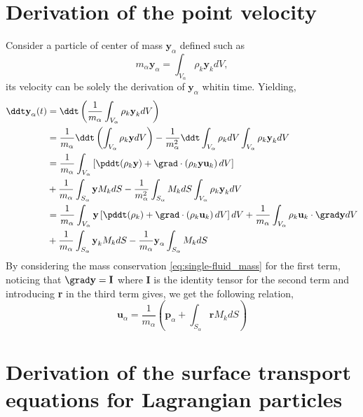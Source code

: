 \section{Derivation of the point velocity}
Consider a particle of center of mass $\textbf{y}_\alpha$ defined such as
\begin{equation*}
    m_\alpha \textbf{y}_\alpha
    = \int_{V_\alpha} \rho_k \textbf{y}_k dV,
\end{equation*}
its velocity can be solely the derivation of $\textbf{y}_\alpha$ whitin time.
Yielding, 
\begin{align*}
    \ddt \textbf{y}_\alpha (t)
    &=
    \ddt \left(
        \frac{1}{m_\alpha} \int_{V_\alpha} \rho_k \textbf{y}_k dV
    \right)\\
    &= \frac{1}{m_\alpha}
    \ddt 
    \left(
        \int_{V_\alpha} \rho_k \textbf{y} dV
    \right)
    - \frac{1}{m_\alpha^2} \ddt \int_{V_\alpha} \rho_k dV \int_{V_\alpha} \rho_k \textbf{y}_k dV
    \\
    &= \frac{1}{m_\alpha}\int_{V_\alpha} \left[
        \pddt (\rho_k \textbf{y}) + \grad \cdot\left(\rho_k \textbf{y}\textbf{u}_k\right) dV 
    \right]\\
    &+ \frac{1}{m_\alpha}\int_{S_\alpha} \textbf{y} M_k d S
    -  \frac{1}{m_\alpha^2} \int_{S_\alpha} M_k dS  \int_{V_\alpha} \rho_k \textbf{y}_k dV
    \\
    &= \frac{1}{m_\alpha}\int_{V_\alpha} \textbf{y} \left[
    \pddt (\rho_k) + \grad \cdot\left(\rho_k \textbf{u}_k\right) dV 
    \right]dV
    + \frac{1}{m_\alpha}\int_{V_\alpha} \rho_k  \textbf{u}_k  \cdot \grad \textbf{y} dV \\
    &+ \frac{1}{m_\alpha}\int_{S_\alpha} \textbf{y}_k M_k d S
    - \frac{1}{m_\alpha}  \textbf{y}_\alpha \int_{S_\alpha} M_k dS
\end{align*}
By considering the mass conservation \ref{eq:single-fluid_mass} for the first term,  noticing that $\grad \textbf{y} = \textbf{I}$ where $\textbf{I}$ is the identity tensor for the second term and introducing \textbf{r} in the third term gives, we get the following relation,
\begin{equation*}
    \textbf{u}_\alpha
    = \frac{1}{m_\alpha} \left(
        \textbf{p}_\alpha
        +  \int_{S_\alpha} \textbf{r} M_k dS
    \right)
\end{equation*}

\section{Derivation of the surface transport equations for Lagrangian particles}

